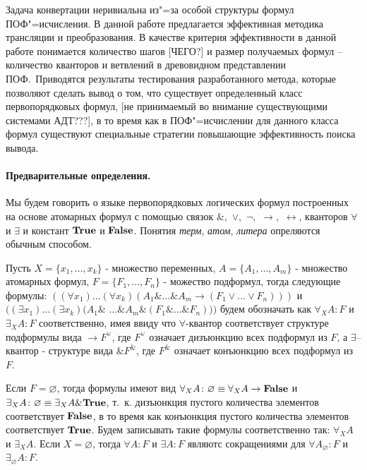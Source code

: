 \documentclass[a4paper]{jctart15b}
\begin{document}
Задача конвертации неривиальна из"=за особой структуры формул ПОФ"=исчисления. В данной работе предлагается эффективная методика трансляции и преобразования. В качестве критерия эффективности в данной работе понимается количество шагов [ЧЕГО?] и размер получаемых формул -- количество кванторов и ветвлений в древовидном представлении ПОФ.~Приводятся результаты тестирования разработанного метода, которые позволяют сделать вывод о том, что существует определенный класс первопорядковых формул, [не принимаемый во внимание существующими системами АДТ???], в то время как в ПОФ"=исчислении для данного класса формул существуют специальные стратегии повышающие эффективность поиска вывода.

\paragraph{Предварительные определения.}

Мы будем говорить о языке первопорядковых логических формул построенных на основе атомарных формул с помощью связок  $\&,$ $\vee,$ $\neg,$ $\rightarrow,$ $\leftrightarrow$, кванторов $\forall$ и $\exists$ и констант $\text{\textbf{True}}$ и $\text{\textbf{False}}$. Понятия \emph{терм}, \emph{атом}, \emph{литера} опреляются обычным способом.

Пусть $X = \{x_1,\ldots,x_k\}$ - множество переменных, $A = \{A_1,\ldots,A_m\}$ - множество атомарных формул, $F = \{F_1,\ldots,F_n\}$ - можество подформул, тогда следующие формулы: $((\forall x_1) \ldots (\forall x_k) (A_1 \& \ldots \& A_m \rightarrow (F_1 \vee \ldots \vee F_n)))$ и $((\exists x_1) \ldots (\exists x_k) (A_1 \&$ $\ldots \& A_m \& (F_1 \& \ldots \& F_n)))$ будем обозначать как $\forall_XA\colon F$ и $\exists_XA\colon F$ соответственно, имея ввиду что $\forall$-квантор соответствует структуре подформулы вида $\rightarrow F^{\vee}$, где $F^{\vee}$ означает дизъюнкцию всех подформул из $F$, а $\exists$--квантор - структуре вида $\& F^{\&}$, где $F^{\&}$ означает конъюнкцию всех подформул из $F$.

Если $F = \varnothing$, тогда формулы имеют вид $\forall_XA\colon\varnothing \equiv \forall_XA \rightarrow \text{\textbf{False}}$ и $\exists_XA\colon\varnothing \equiv \exists_XA \& \text{\textbf{True}}$, т.~к. дизъюнкция пустого количества элементов соответствует $\text{\textbf{False}}$, в то время как конъюнкция пустого количества элементов соответствует $\text{\textbf{True}}$. Будем записывать такие формулы соответственно так: $\forall_XA$ и $\exists_XA$. Если $X = \varnothing$, тогда $\forall A\colon F$ и $\exists A\colon F$ являютс сокращениями для $\forall A_\varnothing\colon F$ и $\exists_\varnothing A\colon F$.
\end{document}
